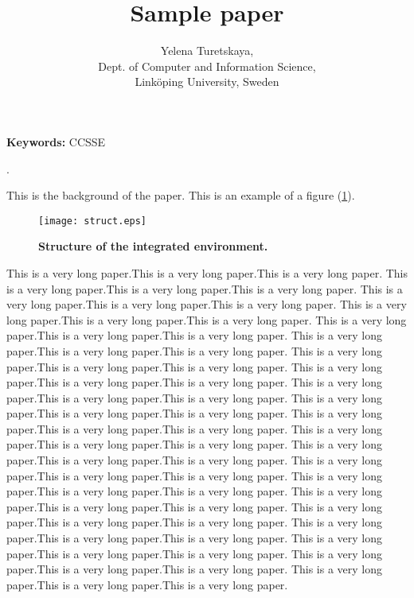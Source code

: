 \documentclass[10pt,twocolumn]{article}
\begin{document}
\newcommand{\icaption}[1]{\caption{\sffamily\bfseries{#1}}}

\pagestyle{empty}


\title{Sample paper}
\author{Yelena Turetskaya, \\Dept. of Computer and Information Science, \\Link\"{o}ping University, Sweden  }
\maketitle



\endabstract{}
\rm
{\bf Keywords:} CCSSE

.


This is the background of the paper.
This is an example of a figure (\ref{fig:struct}).
\begin{figure}[htb]
 \centerline{\texttt{[image: struct.eps]}}
\icaption{Structure of the integrated environment.}
\label{fig:struct}
\end{figure}

This is a very long paper.This is a very long paper.This is a very long paper.
This is a very long paper.This is a very long paper.This is a very long paper.
This is a very long paper.This is a very long paper.This is a very long paper.
This is a very long paper.This is a very long paper.This is a very long paper.
This is a very long paper.This is a very long paper.This is a very long paper.
This is a very long paper.This is a very long paper.This is a very long paper.
This is a very long paper.This is a very long paper.This is a very long paper.
This is a very long paper.This is a very long paper.This is a very long paper.
This is a very long paper.This is a very long paper.This is a very long paper.
This is a very long paper.This is a very long paper.This is a very long paper.
This is a very long paper.This is a very long paper.This is a very long paper.
This is a very long paper.This is a very long paper.This is a very long paper.
This is a very long paper.This is a very long paper.This is a very long paper.
This is a very long paper.This is a very long paper.This is a very long paper.
This is a very long paper.This is a very long paper.This is a very long paper.
This is a very long paper.This is a very long paper.This is a very long paper.
This is a very long paper.This is a very long paper.This is a very long paper.
This is a very long paper.This is a very long paper.This is a very long paper.
This is a very long paper.This is a very long paper.This is a very long paper.
This is a very long paper.This is a very long paper.This is a very long paper.
This is a very long paper.This is a very long paper.This is a very long paper.
\end{document}
